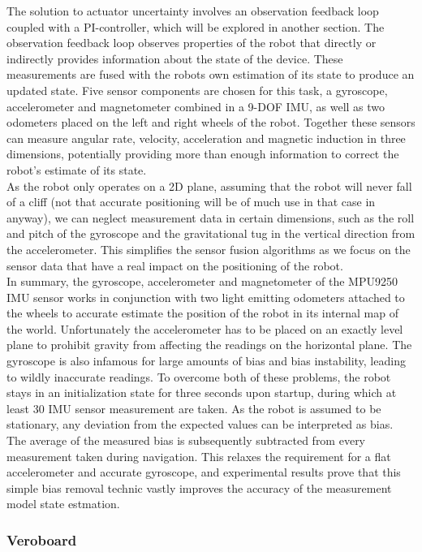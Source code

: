 The solution to actuator uncertainty involves an observation feedback loop coupled with a PI-controller, which will be explored in another section. The observation feedback loop observes properties of the robot that directly or indirectly provides information about the state of the device. These measurements are fused with the robots own estimation of its state to produce an updated state. Five sensor components are chosen for this task, a gyroscope, accelerometer and magnetometer combined in a 9-DOF IMU, as well as two odometers placed on the left and right wheels of the robot. Together these sensors can measure angular rate, velocity, acceleration and magnetic induction in three dimensions, potentially providing more than enough information to correct the robot's estimate of its state. \\

As the robot only operates on a 2D plane, assuming that the robot will never fall of a cliff (not that accurate positioning will be of much use in that case in anyway), we can neglect measurement data in certain dimensions, such as the roll and pitch of the gyroscope and the gravitational tug in the vertical direction from the accelerometer. This simplifies the sensor fusion algorithms as we focus on the sensor data that have a real impact on the positioning of the robot. \\

In summary, the gyroscope, accelerometer and magnetometer of the MPU9250 IMU sensor works in conjunction with two light emitting odometers attached to the wheels to accurate estimate the position of the robot in its internal map of the world. Unfortunately the accelerometer has to be placed on an exactly level plane to prohibit gravity from affecting the readings on the horizontal plane. The gyroscope is also infamous for large amounts of bias and bias instability, leading to wildly inaccurate readings. To overcome both of these problems, the robot stays in an initialization state for three seconds upon startup, during which at least 30 IMU sensor measurement are taken. As the robot is assumed to be stationary, any deviation from the expected values can be interpreted as bias. The average of the measured bias is subsequently subtracted from every measurement taken during navigation. This relaxes the requirement for a flat accelerometer and accurate gyroscope, and experimental results prove that this simple bias removal technic vastly improves the accuracy of the measurement model state estmation.

\subsubsection{Veroboard}
\label{sec:veroboard}

